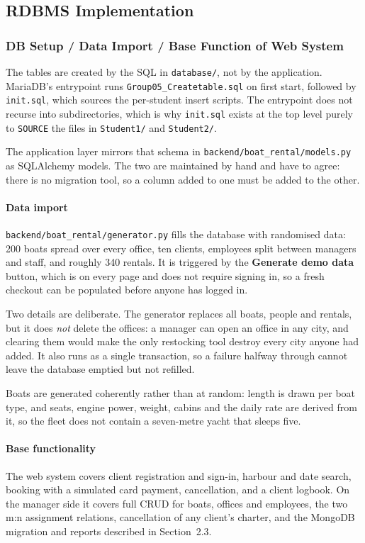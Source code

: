 \documentclass[a4paper, 11pt]{article}          %
\begin{document}
\subsection{RDBMS Implementation}
\subsubsection{DB Setup / Data Import / Base Function of Web System}

The tables are created by the SQL in \texttt{database/}, not by the application.
MariaDB's entrypoint runs \texttt{Group05\_\allowbreak Createtable.sql} on
first start,
followed by \texttt{init.sql}, which sources the per-student insert scripts.
The entrypoint does not recurse into subdirectories, which is why
\texttt{init.sql} exists at the top level purely to \texttt{SOURCE} the files in
\texttt{Student1/} and \texttt{Student2/}.

The application layer mirrors that schema in
\texttt{backend/boat\_rental/\allowbreak models.py} as SQLAlchemy models. The two are
maintained by hand and have to agree: there is no migration tool, so a column
added to one must be added to the other.

\paragraph{Data import} \texttt{backend/boat\_rental/generator.py} fills the
database with randomised data: 200 boats spread over every office, ten clients,
employees split between managers and staff, and roughly 340 rentals. It is
triggered by the \textbf{Generate demo data} button, which is on every page and
does not require signing in, so a fresh checkout can be populated before anyone
has logged in.

Two details are deliberate. The generator replaces all boats, people and
rentals, but it does \emph{not} delete the offices: a manager can open an office
in any city, and clearing them would make the only restocking tool destroy every
city anyone had added. It also runs as a single transaction, so a failure
halfway through cannot leave the database emptied but not refilled.

Boats are generated coherently rather than at random: length is drawn per boat
type, and seats, engine power, weight, cabins and the daily rate are derived
from it, so the fleet does not contain a seven-metre yacht that sleeps five.

\paragraph{Base functionality} The web system covers client registration and
sign-in, harbour and date search, booking with a simulated card payment,
cancellation, and a client logbook. On the manager side it covers full CRUD for
boats, offices and employees, the two m:n assignment relations, cancellation of
any client's charter, and the MongoDB migration and reports described in
Section~2.3.
\end{document}
